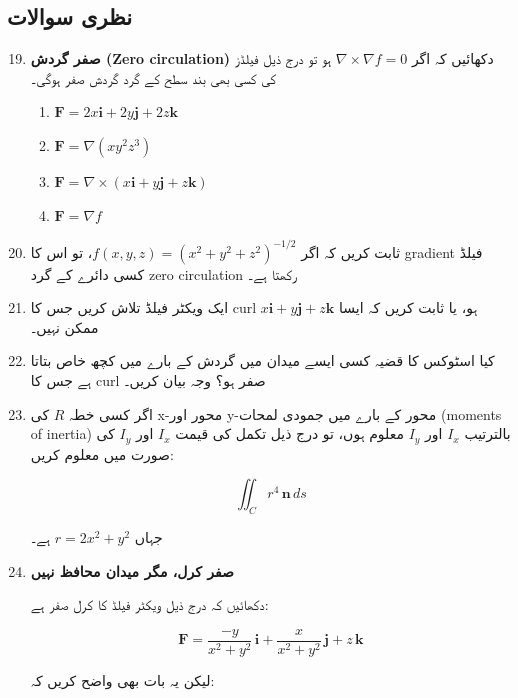 
\subsection*{نظری سوالات}

\begin{enumerate}
\setcounter{enumi}{18}

\item \textbf{صفر گردش (Zero circulation)}  
دکھائیں کہ اگر \( \nabla \times \nabla f = 0 \) ہو تو درج ذیل فیلڈز کی کسی بھی بند سطح کے گرد گردش صفر ہوگی۔

\begin{enumerate}
\item \( \mathbf{F} = 2x\mathbf{i} + 2y\mathbf{j} + 2z\mathbf{k} \)
\item \( \mathbf{F} = \nabla (xy^2 z^3) \)
\item \( \mathbf{F} = \nabla \times (x\mathbf{i} + y\mathbf{j} + z\mathbf{k}) \)
\item \( \mathbf{F} = \nabla f \)
\end{enumerate}

\item
ثابت کریں کہ اگر \( f(x,y,z) = (x^2 + y^2 + z^2)^{-1/2} \)، تو اس کا gradient فیلڈ کسی دائرے کے گرد zero circulation رکھتا ہے۔

\item
ایک ویکٹر فیلڈ تلاش کریں جس کا curl \( x\mathbf{i} + y\mathbf{j} + z\mathbf{k} \) ہو، یا ثابت کریں کہ ایسا ممکن نہیں۔

\item
کیا اسٹوکس کا قضیہ کسی ایسے میدان میں گردش کے بارے میں کچھ خاص بتاتا ہے جس کا curl صفر ہو؟ وجہ بیان کریں۔

\item
اگر کسی خطہ \( R \) کی x-محور اور y-محور کے بارے میں جمودی لمحات (moments of inertia) بالترتیب \( I_x \) اور \( I_y \) معلوم ہوں، تو درج ذیل تکمل کی قیمت \( I_x \) اور \( I_y \) کی صورت میں معلوم کریں:

\[
\iint_C r^4 \, \mathbf{n}\, ds
\]

جہاں \( r = 2x^2 + y^2 \) ہے۔

\bigskip

\item \textbf{صفر کرل، مگر میدان محافظ نہیں}

دکھائیں کہ درج ذیل ویکٹر فیلڈ کا کرل صفر ہے:

\[
\mathbf{F}
=
\frac{-y}{x^2 + y^2}\,\mathbf{i}
+
\frac{x}{x^2 + y^2}\,\mathbf{j}
+
z\,\mathbf{k}
\]

لیکن یہ بات بھی واضح کریں کہ:


\end{enumerate}
